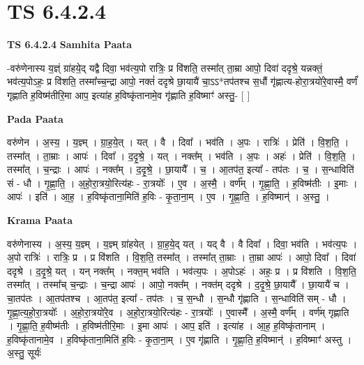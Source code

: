 \documentclass[17pt]{extarticle}
\begin{document}
\section{ TS 6.4.2.4 }

\textbf{TS 6.4.2.4 } \newline
\textbf{Samhita Paata} \newline

-वरु॑णेनास्य य॒ज्ञ्ं ग्रा॑हये॒द् यद्वै दिवा॒ भव॑त्य॒पो रात्रिः॒ प्र वि॑शति॒ तस्मा᳚त् ता॒म्रा आपो॒ दिवा॑ ददृश्रे॒ यन्नक्तं॒ भव॑त्य॒पोऽहः॒ प्र वि॑शति॒ तस्मा᳚च्च॒न्द्रा आपो॒ नक्तं॑ ददृश्रे छा॒यायै॑ चा॒ऽऽ*तप॑तश्च स॒धौं गृ॑ह्णात्य-होरा॒त्रयो॑रे॒वास्मै॒ वर्णं॑ गृह्णाति ह॒विष्म॑तीरि॒मा आप॒ इत्या॑ह ह॒विष्कृ॑तानामे॒व गृ॑ह्णाति ह॒विष्माꣳ॑ अस्तु॒- [  ] \newline

\textbf{Pada Paata} \newline

वरु॑णेन । अ॒स्य॒ । य॒ज्ञ्म् । ग्रा॒ह॒ये॒त् । यत् । वै । दिवा᳚ । भव॑ति । अ॒पः । रात्रिः॑ । प्रेति॑ । वि॒श॒ति॒ । तस्मा᳚त् । ता॒म्राः । आपः॑ । दिवा᳚ । द॒दृ॒श्रे॒ । यत् । नक्त᳚म् । भव॑ति । अ॒पः । अहः॑ । प्रेति॑ । वि॒श॒ति॒ । तस्मा᳚त् । च॒न्द्राः । आपः॑ । नक्त᳚म् । द॒दृ॒श्रे॒ । छा॒यायै᳚ । च॒ । आ॒तप॑त॒ इत्या᳚ - तप॑तः । च॒ । स॒न्धाविति॑ सं - धौ । गृ॒ह्णा॒ति॒ । अ॒हो॒रा॒त्रयो॒रित्य॑हः - रा॒त्रयोः᳚ । ए॒व । अ॒स्मै॒ । वर्ण᳚म् । गृ॒ह्णा॒ति॒ । ह॒विष्म॑तीः । इ॒माः । आपः॑ । इति॑ । आ॒ह॒ । ह॒विष्कृ॑ताना॒मिति॑ ह॒विः - कृ॒ता॒ना॒म् । ए॒व । गृ॒ह्णा॒ति॒ । ह॒विष्मान्॑ । अ॒स्तु॒ ।  \newline


\textbf{Krama Paata} \newline

वरु॑णेनास्य । अ॒स्य॒ य॒ज्ञ्म् । य॒ज्ञ्म् ग्रा॑हयेत् । ग्रा॒ह॒ये॒द् यत् । यद् वै । वै दिवा᳚ । दिवा॒ भव॑ति । भव॑त्य॒पः । अ॒पो रात्रिः॑ । रात्रिः॒ प्र । प्र वि॑शति । वि॒श॒ति॒ तस्मा᳚त् । तस्मा᳚त् ता॒म्राः । ता॒म्रा आपः॑ । आपो॒ दिवा᳚ । दिवा॑ ददृश्रे । द॒दृ॒श्रे॒ यत् । यन् नक्त᳚म् । नक्त॒म् भव॑ति । भव॑त्य॒पः । अ॒पोऽहः॑ । अहः॒ प्र । प्र वि॑शति । वि॒श॒ति॒ तस्मा᳚त् । तस्मा᳚च् च॒न्द्राः । च॒न्द्रा आपः॑ । आपो॒ नक्त᳚म् । नक्त॑म् ददृश्रे । द॒दृ॒श्रे॒ छा॒यायै᳚ । छा॒यायै॑ च । चा॒तप॑तः । आ॒तप॑तश्च । आ॒तप॑त॒ इत्या᳚ - तप॑तः । च॒ स॒न्धौ । स॒न्धौ गृ॑ह्णाति । स॒न्धाविति॑ सम् - धौ । गृ॒ह्णा॒त्य॒हो॒रा॒त्रयोः᳚ । अ॒हो॒रा॒त्रयो॑रे॒व । अ॒हो॒रा॒त्रयो॒रित्य॑हः - रा॒त्रयोः᳚ । ए॒वास्मै᳚ । अ॒स्मै॒ वर्ण᳚म् । वर्ण॑म् गृह्णाति । गृ॒ह्णा॒ति॒ ह॒वीष्म॑तीः । ह॒विष्म॑तीरि॒माः । इ॒मा आपः॑ । आप॒ इति॑ । इत्या॑ह । आ॒ह॒ ह॒विष्कृ॑तानाम् । ह॒विष्कृ॑तानामे॒व । ह॒विष्कृ॑ताना॒मिति॑ ह॒विः - कृ॒ता॒ना॒म् । ए॒व गृ॑ह्णाति । गृ॒ह्णा॒ति॒ ह॒विष्मान्॑ । ह॒विष्माꣳ॑ अस्तु । अ॒स्तु॒ सूर्यः॑ \newline
\end{document}
